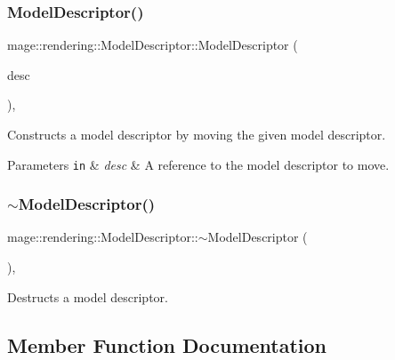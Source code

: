\subsubsection{\texorpdfstring{Model\+Descriptor()}{ModelDescriptor()}\hspace{0.1cm}{\footnotesize\ttfamily [3/3]}}
{\footnotesize\ttfamily mage\+::rendering\+::\+Model\+Descriptor\+::\+Model\+Descriptor (\begin{DoxyParamCaption}\item[{\mbox{\hyperlink{classmage_1_1rendering_1_1_model_descriptor}{Model\+Descriptor}} \&\&}]{desc }\end{DoxyParamCaption})\hspace{0.3cm}{\ttfamily [default]}, {\ttfamily [noexcept]}}

Constructs a model descriptor by moving the given model descriptor.


\begin{DoxyParams}[1]{Parameters}
\mbox{\tt in}  & {\em desc} & A reference to the model descriptor to move. \\
\hline
\end{DoxyParams}
\mbox{\label{classmage_1_1rendering_1_1_model_descriptor_adef21799bc748828e8e04bc74f86aac0}} 
\subsubsection{\texorpdfstring{$\sim$\+Model\+Descriptor()}{~ModelDescriptor()}}
{\footnotesize\ttfamily mage\+::rendering\+::\+Model\+Descriptor\+::$\sim$\+Model\+Descriptor (\begin{DoxyParamCaption}{ }\end{DoxyParamCaption})\hspace{0.3cm}{\ttfamily [virtual]}, {\ttfamily [default]}}

Destructs a model descriptor. 

\subsection{Member Function Documentation}
\mbox{\label{classmage_1_1rendering_1_1_model_descriptor_a4e95ae12e0c952c76aaaf1ee457aed07}} 
